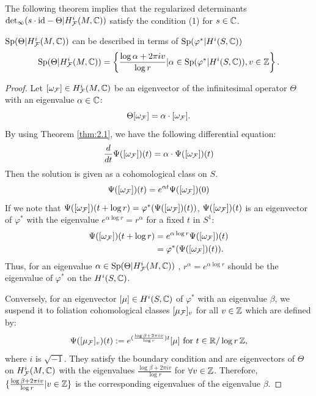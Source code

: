 The following theorem implies that the regularized determinants ${\mathrm{det}}_{\infty}(s \cdot \mathrm{id} - \Theta | H^{i}_{{\mathcal{F}}}(M,{\mathbb{C}}))$ satisfy the condition (1) for $s\in{\mathbb{C}}$. 

\begin{theorem}
\label{thm:3.1}
${\mathrm{Sp}}(\Theta|H^{i}_{{\mathcal{F}}}(M,{\mathbb{C}}))$ can be described in terms of ${\mathrm{Sp}}(\varphi^{*}|H^{i}(S,{\mathbb{C}}))$
\begin{equation}
\label{eq_eigenvalues}
    {\mathrm{Sp}}(\Theta|H^{i}_{{\mathcal{F}}}(M,{\mathbb{C}}))=\left\{ \frac{\log \alpha + 2{\pi}{i}{v}}{\log{r}} |\alpha\in{\mathrm{Sp}}(\varphi^{*}|H^{i}(S,{\mathbb{C}})), v\in{\mathbb{Z}} \right\}.
\end{equation}

\end{theorem}

\begin{proof}
Let $[\omega_{{\mathcal{F}}}] \in H^{i}_{{\mathcal{F}}}(M,{\mathbb{C}})$ be an eigenvector of the infinitesimal operator $\Theta$ with an eigenvalue $\alpha\in{\mathbb{C}}$:
\begin{equation*}
     \Theta [\omega_{{\mathcal{F}}}] =\alpha\cdot[\omega_{{\mathcal{F}}}].
\end{equation*}
By using Theorem \ref{thm:2.1}, we have the following differential equation:
\begin{equation*}
    \frac{d}{dt}\Psi([\omega_{{\mathcal{F}}}])(t)=\alpha\cdot\Psi([\omega_{{\mathcal{F}}}])(t)
\end{equation*}
Then the solution is given as a cohomological class on $S$.
\begin{equation*}
    \Psi([\omega_{{\mathcal{F}}}])(t)=e^{\alpha{t}}\Psi([\omega_{{\mathcal{F}}}])(0)
\end{equation*}
If we note that $\Psi([\omega_{{\mathcal{F}}}])(t+\log{r})=\varphi^{*} (\Psi([\omega_{{\mathcal{F}}}])(t))$, $\Psi([\omega_{{\mathcal{F}}}])(t)$ is an eigenvector of $\varphi^{*}$ with the eigenvalue $e^{\alpha\log{r}}=r^{\alpha}$ for a fixed $t$ in $S^{1}$:
\begin{equation*}
    \begin{split}
    \Psi([\omega_{{\mathcal{F}}}])(t+\log{r})&=e^{\alpha\log{r}} \Psi([\omega_{{\mathcal{F}}}])(t)\\
    &=\varphi^{*} (\Psi([\omega_{{\mathcal{F}}}])(t)).
    \end{split}
\end{equation*}
Thus, for an eigenvalue $\alpha \in {\mathrm{Sp}}(\Theta|H^{i}_{{\mathcal{F}}}(M,{\mathbb{C}}))$ , $r^{\alpha}=e^{\alpha \log{r}}$ should be the eigenvalue of $\varphi^{*}$ on the $H^{i}(S,{\mathbb{C}})$.

Conversely, for an eigenvector $[\mu] \in H^{i}(S,{\mathbb{C}})$  of $\varphi^{*}$ with an eigenvalue $\beta$, we suspend it to foliation cohomological classes $[\mu_{{\mathcal{F}}}]_{v}$ for all $v\in{\mathbb{Z}}$ which are defined by:
\begin{equation*}
    \Psi([\mu_{{\mathcal{F}}}]_{v})(t) := e^{(\frac{\log\beta+2\pi {i}{v}}{\log{r}})t}[\mu]\ \mathrm{for} \ t \in {\mathbb{R}}/\log{r}\,{\mathbb{Z}},
\end{equation*}
where $i$ is $\sqrt{-1}$. They satisfy the boundary condition and are eigenvectors of $\Theta$ on $H^{i}_{{\mathcal{F}}}(M,{\mathbb{C}})$ with the eigenvalues $\frac{\log \beta + 2 \pi{i}{v}}{\log{r}}$ for $\forall v \in {\mathbb{Z}}$. Therefore, $\{ \frac{\log \beta + 2 \pi{i}{v}}{\log{r}} |v \in {\mathbb{Z}} \}$ is the corresponding eigenvalues of the eigenvalue $\beta$.
\end{proof}
